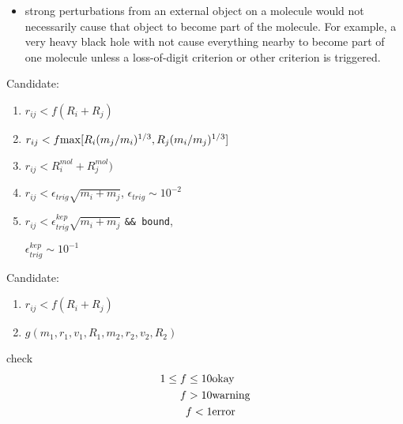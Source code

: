 \documentclass{article}[12pt]
\begin{document}
\begin{itemize}
\item strong perturbations from an external object on a molecule
   would not necessarily cause that object to become part of
   the molecule.  For example, a very heavy black hole with not
   cause everything nearby to become part of one molecule unless
   a loss-of-digit criterion or other criterion is triggered.
\end{itemize}

\clearpage
\large
\begin{minipage}[b]{7.9cm}

\noindent
Candidate:
\begin{enumerate}
\item $ r_{ij} < f(R_i+R_j)$
\item $ r_{ij} < f{\rm max}[R_i(m_j/m_i)^{1/3},R_j(m_i/m_j)^{1/3}]$
\item $ r_{ij} < R_i^{mol}+R_j^{mol})$
\item $ r_{ij} < \epsilon_{trig}\sqrt{m_i+m_j}$, $\epsilon_{trig} \sim 10^{-2}$
\item $ r_{ij} < \epsilon_{trig}^{kep}\sqrt{m_i+m_j}$ {\tt \&\&
bound},

$\epsilon_{trig}^{kep} \sim 10^{-1}$
\end{enumerate}

\end{minipage}
\begin{minipage}[b]{7.9cm}
Candidate:
\begin{enumerate}
\item $ r_{ij} < f(R_i+R_j)$
\item $g(m_{1},r_{1},v_{1},R_{1}, m_{2},r_{2},v_{2},R_{2})$

\end{enumerate}
\end{minipage}


\epsfxsize \columnwidth
{}

\begin{center}
check
\begin{eqnarray}
1\le f \le 10 & {\rm okay}\nonumber\\
 f > 10 & {\rm warning}\nonumber\\
 f < 1 & {\rm error}\nonumber
\end{eqnarray}
\end{center}
\end{document}
